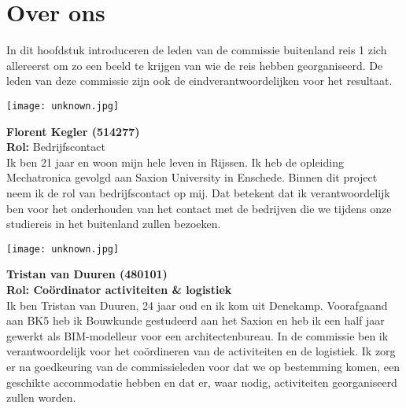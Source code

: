 \section*{Over ons}

In dit hoofdstuk introduceren de leden van de commissie buitenland reis 1 zich allereerst om zo een beeld te krijgen van wie de reis hebben georganiseerd. De leden van deze commissie zijn ook de eindverantwoordelijken voor het resultaat.

\vspace{1cm}

\begin{minipage}{0.5\linewidth}
	\texttt{[image: unknown.jpg]}
\end{minipage}
\hfill
\vspace{1cm}
\begin{minipage}{\linewidth}
	\textbf{Florent Kegler (514277)} \\
	\textbf{Rol:} Bedrijfscontact \\
	Ik ben 21 jaar en woon mijn hele leven in Rijssen. Ik heb de opleiding Mechatronica gevolgd aan Saxion University in Enschede. Binnen dit project neem ik de rol van bedrijfscontact op mij. Dat betekent dat ik verantwoordelijk ben voor het onderhouden van het contact met de bedrijven die we tijdens onze studiereis in het buitenland zullen bezoeken.
\end{minipage}

\vspace{1cm}

\begin{minipage}{0.5\linewidth}
	\texttt{[image: unknown.jpg]}
\end{minipage}
\hfill
\vspace{1cm}
\begin{minipage}{\linewidth}
	\textbf{Tristan van Duuren (480101)} \\
	\textbf{Rol: Coördinator activiteiten \& logistiek}  \\
	Ik ben Tristan van Duuren, 24 jaar oud en ik kom uit Denekamp. Voorafgaand aan BK5 heb ik Bouwkunde gestudeerd aan het Saxion en heb ik een half jaar gewerkt als BIM-modelleur voor een architectenbureau. In de commissie ben ik verantwoordelijk voor het coördineren van de activiteiten en de logistiek. Ik zorg er na goedkeuring van de commissieleden voor dat we op bestemming komen, een geschikte accommodatie hebben en dat er, waar nodig, activiteiten georganiseerd zullen worden. 
\end{minipage}

